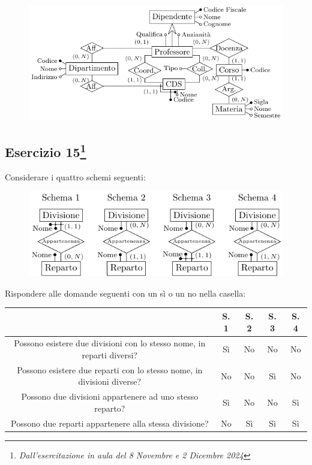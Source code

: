 \documentclass{article}
\begin{document}
\begin{figure}[H]%
    \centering%
    \includegraphics[scale=1.25]{esercizio_4_29-11-24.pdf}%
\end{figure}

\subsection{Esercizio 15\footnote{\textit{Dall'esercitazione in aula del 8 Novembre e 2 Dicembre 2024}}}

Considerare i quattro schemi seguenti:
\begin{figure}[H]%
    \centering%
    \includegraphics[scale=1.2, trim={0 0 0 0.2cm}]{domanda_8-11-24.pdf}%
\end{figure}

Rispondere alle domande seguenti con un sì o un no nella casella:
\begin{center}
    \begin{tabular}{|c|c|c|c|c|}
        \hline
        & S. 1 & S. 2 & S. 3 & S. 4\\
        \hline
        Possono esistere due divisioni con lo stesso nome, in reparti diversi? & Sì & No & No & No\\
        \hline
        Possono esistere due reparti con lo stesso nome, in divisioni diverse? & No & No & Sì & No\\
        \hline
        Possono due divisioni appartenere ad uno stesso reparto? & Sì & No & No & Sì\\
        \hline
        Possono due reparti appartenere alla stessa divisione? & No & Sì & Sì & Sì\\
        \hline        
    \end{tabular}
\end{center}
\end{document}
